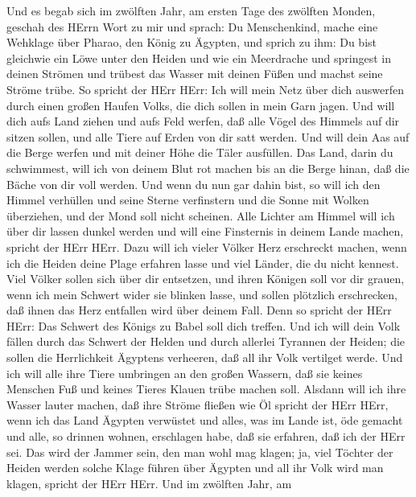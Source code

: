  Und es begab sich im zwölften Jahr, am ersten Tage des
zwölften Monden, geschah des HErrn Wort zu mir und sprach: 
Du Menschenkind, mache eine Wehklage über Pharao, den König zu Ägypten,
und sprich zu ihm: Du bist gleichwie ein Löwe unter den Heiden und wie
ein Meerdrache und springest in deinen Strömen und trübest das Wasser
mit deinen Füßen und machst seine Ströme trübe.  So spricht
der HErr HErr: Ich will mein Netz über dich auswerfen durch einen großen
Haufen Volks, die dich sollen in mein Garn jagen.  Und will
dich aufs Land ziehen und aufs Feld werfen, daß alle Vögel des Himmels
auf dir sitzen sollen, und alle Tiere auf Erden von dir satt werden.
 Und will dein Aas auf die Berge werfen und mit deiner Höhe
die Täler ausfüllen.  Das Land, darin du schwimmest, will
ich von deinem Blut rot machen bis an die Berge hinan, daß die Bäche von
dir voll werden.  Und wenn du nun gar dahin bist, so will
ich den Himmel verhüllen und seine Sterne verfinstern und die Sonne mit
Wolken überziehen, und der Mond soll nicht scheinen.  Alle
Lichter am Himmel will ich über dir lassen dunkel werden und will eine
Finsternis in deinem Lande machen, spricht der HErr HErr. 
Dazu will ich vieler Völker Herz erschreckt machen, wenn ich die Heiden
deine Plage erfahren lasse und viel Länder, die du nicht kennest.
 Viel Völker sollen sich über dir entsetzen, und ihren
Königen soll vor dir grauen, wenn ich mein Schwert wider sie blinken
lasse, und sollen plötzlich erschrecken, daß ihnen das Herz entfallen
wird über deinem Fall.  Denn so spricht der HErr HErr: Das
Schwert des Königs zu Babel soll dich treffen.  Und ich
will dein Volk fällen durch das Schwert der Helden und durch allerlei
Tyrannen der Heiden; die sollen die Herrlichkeit Ägyptens verheeren, daß
all ihr Volk vertilget werde.  Und ich will alle ihre Tiere
umbringen an den großen Wassern, daß sie keines Menschen Fuß und keines
Tieres Klauen trübe machen soll.  Alsdann will ich ihre
Wasser lauter machen, daß ihre Ströme fließen wie Öl spricht der HErr
HErr,  wenn ich das Land Ägypten verwüstet und alles, was
im Lande ist, öde gemacht und alle, so drinnen wohnen, erschlagen habe,
daß sie erfahren, daß ich der HErr sei.  Das wird der
Jammer sein, den man wohl mag klagen; ja, viel Töchter der Heiden werden
solche Klage führen über Ägypten und all ihr Volk wird man klagen,
spricht der HErr HErr.  Und im zwölften Jahr, am

